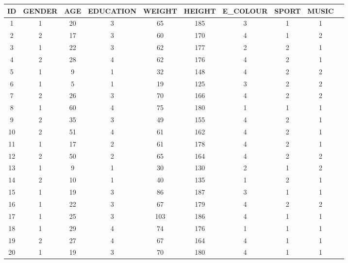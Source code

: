 	\begin{tabular}{cccccccccc}
	\toprule
	ID&
	GENDER&
	AGE&
	EDUCATION&
	WEIGHT&
	HEIGHT&
	E\_COLOUR&
	SPORT&
	MUSIC
	\\
	\midrule
	1&1&20&3&65&185&3&1&1\\
	\midrule
	2&2&17&3&60&170&4&1&2\\
	\midrule
	3&1&22&3&62&177&2&2&1\\
	\midrule
	4&2&28&4&62&176&4&2&1\\
	\midrule
	5&1&9&1&32&148&4&2&2\\
	\midrule
	6&1&5&1&19&125&3&2&2\\
	\midrule
	7&2&26&3&70&166&4&2&2\\
	\midrule
	8&1&60&4&75&180&1&1&1\\
	\midrule
	9&2&35&3&49&155&4&2&1\\
	\midrule
	10&2&51&4&61&162&4&2&1\\
	\midrule
	11&1&17&2&61&178&4&2&1\\
	\midrule
	12&2&50&2&65&164&4&2&2\\
	\midrule
	13&1&9&1&30&130&2&1&2\\
	\midrule
	14&2&10&1&40&135&1&2&1\\
	\midrule
	15&1&19&3&86&187&3&1&1\\
	\midrule
	16&1&22&3&67&179&4&2&2\\
	\midrule
	17&1&25&3&103&186&4&1&1\\
	\midrule
	18&1&29&4&74&176&1&1&1\\
	\midrule
	19&2&27&4&67&164&4&1&1\\
	\midrule
	20&1&19&3&70&180&4&1&1\\
	\bottomrule
	\end{tabular}
